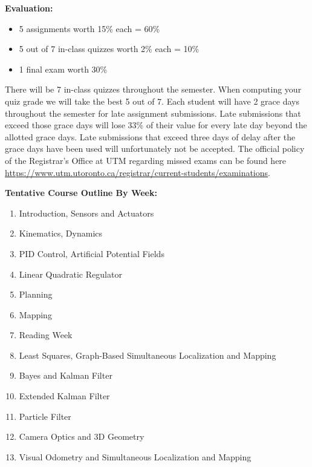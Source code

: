 \documentclass[11pt, a4paper]{article}
\begin{document}
\vspace*{.15in}
\noindent\textbf{Evaluation:}
\begin{itemize}
\item 5 assignments worth 15\% each = 60\%
\item 5 out of 7 in-class quizzes worth 2\% each = 10\%
\item 1 final exam worth 30\%
\end{itemize}
\noindent There will be 7 in-class quizzes throughout the semester. When computing
your quiz grade we will take the best 5 out of 7. Each student will have 2 grace days throughout the semester for late assignment submissions. Late submissions that exceed those grace days will lose 33\% of their value for every late day beyond the allotted grace days. Late submissions that exceed three days of delay after the grace days have been used will unfortunately not be accepted. The official policy of the Registrar's Office at UTM regarding missed exams can be found here \url{https://www.utm.utoronto.ca/registrar/current-students/examinations}.

\vspace*{.15in}
\newpage


\noindent \textbf{Tentative Course Outline By Week:}
\begin{center}
  \begin{minipage}{5in}
    \begin{flushleft}
      \begin{enumerate}
      \item Introduction, Sensors and Actuators
      \item Kinematics, Dynamics
      \item PID Control, Artificial Potential Fields
      \item Linear Quadratic Regulator
      \item Planning
      \item Mapping
      \item Reading Week
      \item Least Squares, Graph-Based Simultaneous Localization and Mapping
      \item Bayes and Kalman Filter
      \item Extended Kalman Filter
      \item Particle Filter
      \item Camera Optics and 3D Geometry
      \item Visual Odometry and Simultaneous Localization and Mapping
      \end{enumerate}
    \end{flushleft}
  \end{minipage}
\end{center}
\end{document}
